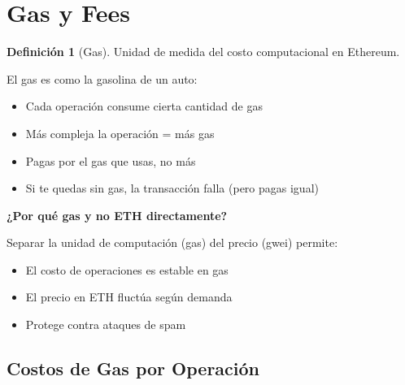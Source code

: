 \documentclass[11pt,a4paper,twoside,openright]{book}
\theoremstyle{definition}
\newtheorem{definition}{Definición}[chapter]
\theoremstyle{plain}
\theoremstyle{remark}
\begin{document}
\section{Gas y Fees}

\begin{definition}[Gas]
Unidad de medida del costo computacional en Ethereum.
\end{definition}

\begin{intuicion}
El gas es como la gasolina de un auto:
\begin{itemize}
    \item Cada operación consume cierta cantidad de gas
    \item Más compleja la operación = más gas
    \item Pagas por el gas que usas, no más
    \item Si te quedas sin gas, la transacción falla (pero pagas igual)
\end{itemize}

\textbf{¿Por qué gas y no ETH directamente?}

Separar la unidad de computación (gas) del precio (gwei) permite:
\begin{itemize}
    \item El costo de operaciones es estable en gas
    \item El precio en ETH fluctúa según demanda
    \item Protege contra ataques de spam
\end{itemize}
\end{intuicion}

\subsection{Costos de Gas por Operación}
\end{document}
